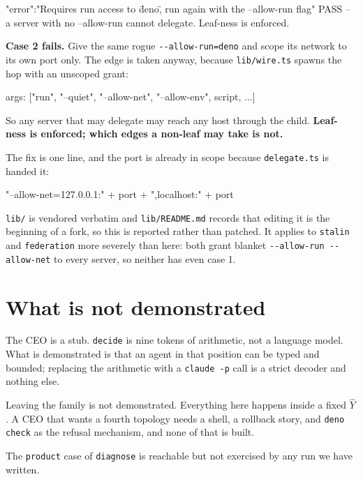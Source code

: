 \documentclass[11pt,a4paper]{article}
\begin{document}
\begin{term}
{"error":"Requires run access to \"deno\", run again with the --allow-run flag"}
PASS -- a server with no --allow-run cannot delegate. Leaf-ness is enforced.
\end{term}

\begin{alarmbox}
\textbf{Case 2 fails.} Give the same rogue \texttt{-{}-allow-run=deno} and scope
its network to its own port only. The edge is taken anyway, because
\texttt{lib/wire.ts} spawns the hop with an unscoped grant:

\begin{term}
args: ["run", "--quiet", "--allow-net", "--allow-env", script, ...]
\end{term}

So any server that may delegate may reach any host through the child.
\textbf{Leaf-ness is enforced; which edges a non-leaf may take is not.}

The fix is one line, and the port is already in scope because
\texttt{delegate.ts} is handed it:

\begin{term}
"--allow-net=127.0.0.1:" + port + ",localhost:" + port
\end{term}

\texttt{lib/} is vendored verbatim and \texttt{lib/README.md} records that
editing it is the beginning of a fork, so this is reported rather than patched.
It applies to \texttt{stalin} and \texttt{federation} more severely than here:
both grant blanket \texttt{-{}-allow-run -{}-allow-net} to every server, so
neither has even case 1.
\end{alarmbox}

\section{What is not demonstrated}

The CEO is a stub. \texttt{decide} is nine tokens of arithmetic, not a language
model. What is demonstrated is that an agent in that position can be typed and
bounded; replacing the arithmetic with a \texttt{claude -p} call is a strict
decoder and nothing else.

Leaving the family is not demonstrated. Everything here happens inside a fixed
$\hat{Y}$. A CEO that wants a fourth topology needs a shell, a rollback story,
and \texttt{deno check} as the refusal mechanism, and none of that is built.

The \texttt{product} case of \texttt{diagnose} is reachable but not exercised by
any run we have written.
\end{document}
